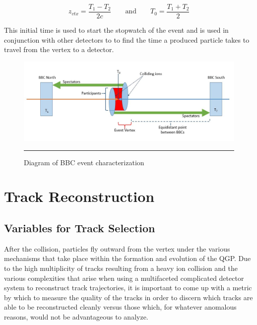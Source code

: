 \begin{equation}
 z_{vtx} = \frac{T_1 - T_2}{2c} \qquad\text{and}\qquad T_0 = \frac{T_1 + T_2}{2}
\end{equation}

This initial time is used to start the stopwatch of the event and is used in conjunction with other detectors to to find the time a produced particle takes to travel from the vertex to a detector.

\begin{figure}[htbp!]
  \centering
    \includegraphics[width=1\textwidth]{Figures/BBCevtchar.JPG}
    \rule{35em}{0.5pt}
  \caption[Diagram of BBC event characterization]{Diagram of BBC event characterization}
  \label{fig:bbcvtx}
\end{figure}

\section{Track Reconstruction}
\label{trkrecosect}
\subsection{Variables for Track Selection}
After the collision, particles fly outward from the vertex under the various mechanisms that take place within the formation and evolution of the QGP. Due to the high multiplicity of tracks resulting from a heavy ion collision and the various complexities that arise when using a multifaceted complicated detector system to reconstruct track trajectories, it is important to come up with a metric by which to measure the quality of the tracks in order to discern which tracks are able to be reconstructed cleanly versus those which, for whatever anomalous reasons, would not be advantageous to analyze.
